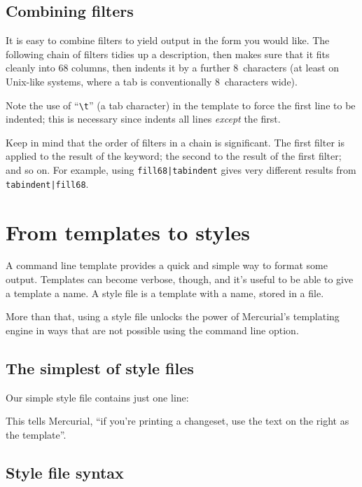 {{\subsection{Combining filters}

It is easy to combine filters to yield output in the form you would
like.  The following chain of filters tidies up a description, then
makes sure that it fits cleanly into 68 columns, then indents it by a
further 8~characters (at least on Unix-like systems, where a tab is
conventionally 8~characters wide).


Note the use of ``\Verb+\t+'' (a tab character) in the template to
force the first line to be indented; this is necessary since
 indents all lines \emph{except} the first.

Keep in mind that the order of filters in a chain is significant.  The
first filter is applied to the result of the keyword; the second to
the result of the first filter; and so on.  For example, using
\Verb+fill68|tabindent+ gives very different results from
\Verb+tabindent|fill68+.


\section{From templates to styles}

A command line template provides a quick and simple way to format some
output.  Templates can become verbose, though, and it's useful to be
able to give a template a name.  A style file is a template with a
name, stored in a file.

More than that, using a style file unlocks the power of Mercurial's
templating engine in ways that are not possible using the command line
 option.

\subsection{The simplest of style files}

Our simple style file contains just one line:


This tells Mercurial, ``if you're printing a changeset, use the text
on the right as the template''.

\subsection{Style file syntax}

}}

